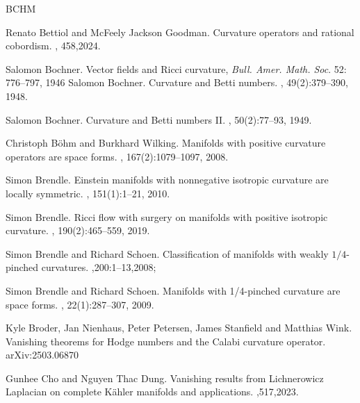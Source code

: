 \documentclass[12pt, reqno]{amsart}
\theoremstyle{plain}
\theoremstyle{definition}
\renewcommand{\>}{\rightarrow}
\renewcommand{\#}{\sharp}
\numberwithin{equation}{section} %
\begin{document}
\begin{thebibliography}{BCHM}




    Renato Bettiol and McFeely Jackson Goodman.
    \newblock Curvature operators and rational cobordism.
    , 458,2024.

    Salomon Bochner.  Vector fields and Ricci curvature, {\emph{Bull. Amer. Math. Soc}}. 52: 776--797,  1946
    Salomon Bochner.
    \newblock Curvature and Betti numbers.
    , 49(2):379--390, 1948.


    Salomon Bochner.   Curvature and Betti numbers II.  , 50(2):77--93, 1949.

    Christoph B\"ohm and Burkhard Wilking.
    \newblock Manifolds with positive curvature operators are space forms.
    , 167(2):1079--1097, 2008.



    Simon Brendle.
    \newblock Einstein manifolds with nonnegative isotropic curvature are locally symmetric.
    , 151(1):1--21, 2010.

    Simon Brendle.
    \newblock Ricci flow with surgery on manifolds with positive isotropic curvature.
    , 190(2):465--559, 2019.

    Simon Brendle and Richard Schoen.
    \newblock Classification of manifolds with weakly $1/4$-pinched curvatures.
    ,200:1--13,2008;

    Simon Brendle and Richard Schoen.
    \newblock Manifolds with 1/4-pinched curvature are space forms.
    , 22(1):287--307, 2009.


  Kyle Broder, Jan Nienhaus, Peter Petersen, James Stanfield and Matthias Wink. Vanishing theorems for Hodge numbers and the Calabi curvature operator.   arXiv:2503.06870


    Gunhee Cho and Nguyen Thac Dung.
    \newblock Vanishing results from Lichnerowicz Laplacian on complete K\"ahler manifolds and applications.
    ,517,2023.




\end{thebibliography}
\end{document}

